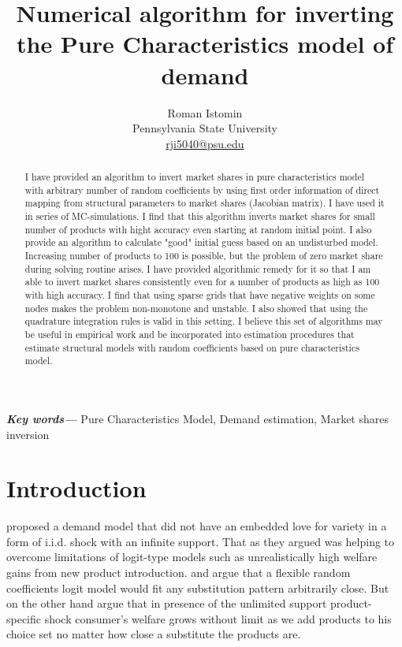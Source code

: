 \documentclass[12pt,letterpaper]{article}
\author{Roman Istomin \\ Pennsylvania State University \\  \href{mailto:rji5040@psu.edu}{rji5040@psu.edu} }
\title{Numerical algorithm for inverting the Pure Characteristics model of demand}
\providecommand{\keywords}[1]{\textbf{\textit{Key words---}} #1}
\begin{document}
	\maketitle
	
	\begin{abstract}
	I have provided an algorithm to invert market shares in pure characteristics model with arbitrary number of random coefficients by using first order information of direct mapping from structural parameters to market shares (Jacobian matrix). I have used it in series of MC-simulations. I find that this algorithm inverts market shares for small number of products with hight accuracy even starting at random initial point. I also provide an algorithm to calculate "good" initial guess based on an undisturbed model.
	Increasing number of products to 100 is possible, but the problem of zero market share during solving routine arises. I have provided algorithmic remedy for it so that I am able to invert market shares consistently even for a number of products as high as 100 with high accuracy. I find that using sparse grids that have negative weights on some nodes makes the problem non-monotone and unstable. I also showed that using the quadrature integration rules is valid in this setting. I believe this set of algorithms may be useful in empirical work and be incorporated into estimation procedures that estimate structural models with random coefficients based on pure characteristics model.
	\end{abstract}
	
	\keywords{Pure Characteristics Model, Demand estimation, Market shares inversion}
	
	\section{Introduction}
	\cite{berry2007pure} proposed a demand model that did not have an embedded love for variety in a form of i.i.d. shock with an infinite support. That as they argued was helping to overcome limitations of logit-type models such as unrealistically high welfare gains from new product introduction. \cite{mcfadden1978modeling} and \cite{nevo2000practitioner} argue that a flexible random coefficients logit model would fit any substitution pattern arbitrarily close. But on the other hand \cite{berry2007pure} argue that in presence of the unlimited support product-specific shock consumer's welfare grows without limit as we add products to his choice set no matter how close a substitute the products are. 
	
\end{document}
